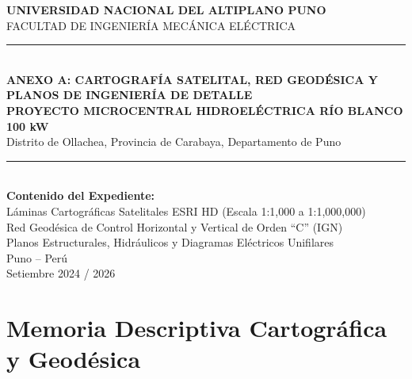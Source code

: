 \documentclass[11pt,a4paper]{report}
\begin{document}
\begin{titlepage}
\begin{center}
    \vspace*{2cm}
    {\Large\bfseries UNIVERSIDAD NACIONAL DEL ALTIPLANO PUNO}\\[0.5em]
    {\large FACULTAD DE INGENIERÍA MECÁNICA ELÉCTRICA}\\[2.5cm]

    \rule{\linewidth}{2pt}\\[0.4cm]
    {\huge\bfseries\color{navyblue} ANEXO A: CARTOGRAFÍA SATELITAL, RED GEODÉSICA Y PLANOS DE INGENIERÍA DE DETALLE}\\[0.4cm]
    {\Large\bfseries PROYECTO MICROCENTRAL HIDROELÉCTRICA RÍO BLANCO 100 kW}\\[0.4cm]
    {\large Distrito de Ollachea, Provincia de Carabaya, Departamento de Puno}\\[0.4cm]
    \rule{\linewidth}{2pt}\\[2.5cm]

    \textbf{Contenido del Expediente:}\\
    Láminas Cartográficas Satelitales ESRI HD (Escala 1:1,000 a 1:1,000,000)\\
    Red Geodésica de Control Horizontal y Vertical de Orden ``C'' (IGN)\\
    Planos Estructurales, Hidráulicos y Diagramas Eléctricos Unifilares\\[2cm]

    \vfill
    {\large Puno -- Perú}\\[0.3em]
    {\normalsize Setiembre 2024 / 2026}
\end{center}
\end{titlepage}

\chapter{Memoria Descriptiva Cartográfica y Geodésica}
\end{document}
